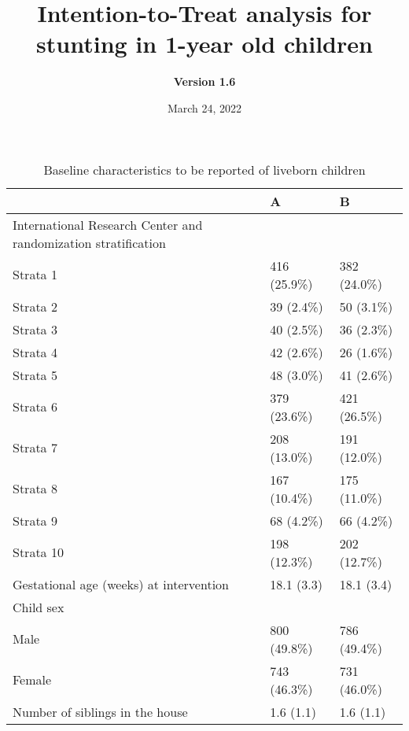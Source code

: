 \documentclass[
]{article}
\title{\textbf{Intention-to-Treat analysis for stunting in 1-year old
children}}
\subtitle{\textbf{Version 1.6}}
\author{}
\date{\vspace{-2.5em}March 24, 2022}
\begin{document}
\maketitle

{
\setcounter{tocdepth}{2}
\tableofcontents
}
\begin{table}[H]

\caption{\label{tab:unnamed-chunk-2}Baseline characteristics to be reported of liveborn children}
\centering
\begin{tabular}[t]{l|l|l}
\hline
  & A & B\\
\hline
International Research Center and randomization stratification &  & \\
\hline
\hspace{1em}Strata 1 & 416 (25.9\%) & 382 (24.0\%)\\
\hline
\hspace{1em}Strata 2 & 39  (2.4\%) & 50  (3.1\%)\\
\hline
\hspace{1em}Strata 3 & 40  (2.5\%) & 36  (2.3\%)\\
\hline
\hspace{1em}Strata 4 & 42  (2.6\%) & 26  (1.6\%)\\
\hline
\hspace{1em}Strata 5 & 48  (3.0\%) & 41  (2.6\%)\\
\hline
\hspace{1em}Strata 6 & 379 (23.6\%) & 421 (26.5\%)\\
\hline
\hspace{1em}Strata 7 & 208 (13.0\%) & 191 (12.0\%)\\
\hline
\hspace{1em}Strata 8 & 167 (10.4\%) & 175 (11.0\%)\\
\hline
\hspace{1em}Strata 9 & 68  (4.2\%) & 66  (4.2\%)\\
\hline
\hspace{1em}Strata 10 & 198 (12.3\%) & 202 (12.7\%)\\
\hline
Gestational age (weeks) at intervention & 18.1 (3.3) & 18.1 (3.4)\\
\hline
Child sex &  & \\
\hline
\hspace{1em}Male & 800 (49.8\%) & 786 (49.4\%)\\
\hline
\hspace{1em}Female & 743 (46.3\%) & 731 (46.0\%)\\
\hline
Number of siblings in the house & 1.6 (1.1) & 1.6 (1.1)\\

\end{tabular}
\end{table}
\end{document}
